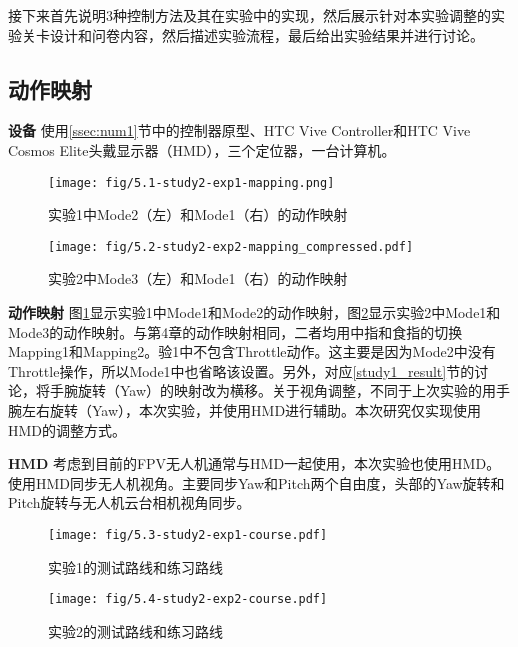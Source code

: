 接下来首先说明3种控制方法及其在实验中的实现，然后展示针对本实验调整的实验关卡设计和问卷内容，然后描述实验流程，最后给出实验结果并进行讨论。

\subsection{动作映射}

\textbf{设备}\hspace{1pt}
使用\ref{ssec:num1}节中的控制器原型、HTC Vive Controller和HTC Vive Cosmos Elite头戴显示器（HMD），三个定位器，一台计算机。

\begin{figure}[t]
    \centering
    \texttt{[image: fig/5.1-study2-exp1-mapping.png]}
    \caption{实验1中Mode2（左）和Mode1（右）的动作映射}
    \label{fig:exp1_mode1_and_mode2}
\end{figure}

\begin{figure}[t]
    \centering
    \texttt{[image: fig/5.2-study2-exp2-mapping\_compressed.pdf]}
    \caption{实验2中Mode3（左）和Mode1（右）的动作映射}
    \label{fig:exp2_mode1_and_mode3}
\end{figure}

\textbf{动作映射}\hspace{1pt}
图\ref{fig:exp1_mode1_and_mode2}显示实验1中Mode1和Mode2的动作映射，图\ref{fig:exp2_mode1_and_mode3}显示实验2中Mode1和Mode3的动作映射。与第4章的动作映射相同，二者均用中指和食指的切换Mapping1和Mapping2。验1中不包含Throttle动作。这主要是因为Mode2中没有Throttle操作，所以Mode1中也省略该设置。另外，对应\ref{study1_result}节的讨论，将手腕旋转（Yaw）的映射改为横移。关于视角调整，不同于上次实验的用手腕左右旋转（Yaw），本次实验，并使用HMD进行辅助。本次研究仅实现使用HMD的调整方式。

\textbf{HMD}\hspace{1pt}
考虑到目前的FPV无人机通常与HMD一起使用，本次实验也使用HMD。使用HMD同步无人机视角。主要同步Yaw和Pitch两个自由度，头部的Yaw旋转和Pitch旋转与无人机云台相机视角同步。


\begin{figure}[t]
    \vspace{-2em}
    \centering
    \texttt{[image: fig/5.3-study2-exp1-course.pdf]}
    \caption{实验1的测试路线和练习路线}
    \label{fig:study2-exp1-course}
\end{figure}

\begin{figure}[t]
    \centering
    \texttt{[image: fig/5.4-study2-exp2-course.pdf]}
    \caption{实验2的测试路线和练习路线}
    \label{fig:study2-exp2-course}
\end{figure}

